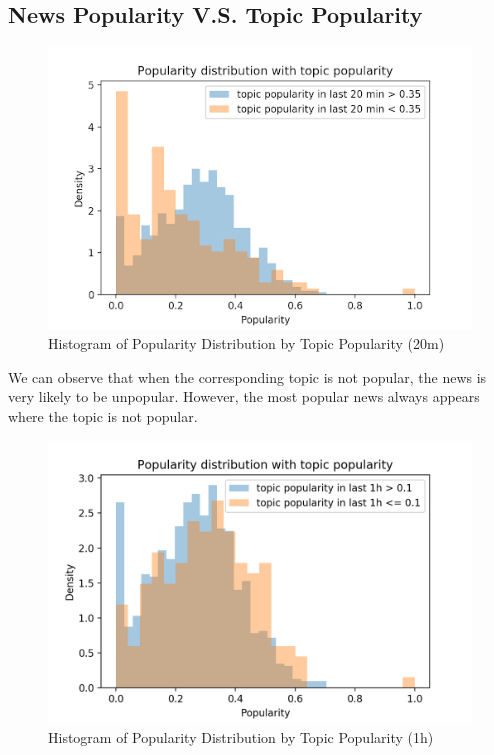 \documentclass{article}
\begin{document}
\subsection{News Popularity V.S. Topic Popularity}

\begin{figure}[H]
\centering
\includegraphics[scale=0.45]{"popu distrib 20m"}
\caption{Histogram of Popularity Distribution by Topic Popularity (20m)}
\end{figure}

We can observe that when the corresponding topic is not popular, the news is very likely to be unpopular. However, the most popular news always appears where the topic is not popular. 

\begin{figure}[H]
\centering
\includegraphics[scale=0.5]{"Popularity distrib 1h"}
\caption{Histogram of Popularity Distribution by Topic Popularity (1h)}
\end{figure}
\end{document}
